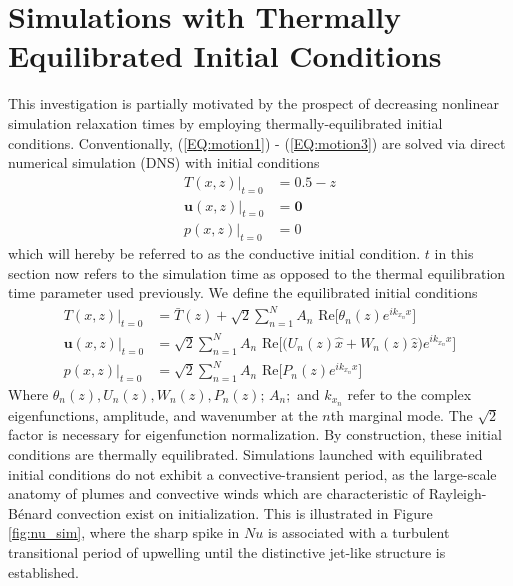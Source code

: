 \documentclass[reprint,amsmath,amssymb,aps]{revtex4-1}
\begin{document}
\section{Simulations with Thermally Equilibrated Initial Conditions}
This investigation is partially motivated by the prospect of decreasing nonlinear simulation relaxation times by employing thermally-equilibrated initial conditions. Conventionally, (\ref{EQ:motion1}) - (\ref{EQ:motion3}) are solved via direct numerical simulation (DNS) with initial conditions
\begin{align}
    T(x, z)\big|_{t=0} &= 0.5 - z \\
    \mathbf{u}(x, z)\big|_{t=0} &= \mathbf{0} \\
    p(x, z)\big|_{t=0} &= 0
\end{align}
which will hereby be referred to as the conductive initial condition. $t$ in this section now refers to the simulation time as opposed to the thermal equilibration time parameter used previously. We define the equilibrated initial conditions
\begin{align}
    T(x, z)\big|_{t=0} &= \bar{T}(z) + \sqrt{2} \sum_{n=1}^N  A_n \text{ Re} \Big[ \theta_n(z) e^{ik_{x_n}x} \Big] \nonumber \\
    \mathbf{u}(x, z)\big|_{t=0} &= \sqrt{2} \sum_{n=1}^N A_n \text{ Re} \Big[\Big( U_n (z) \hat{x} + W_n(z) \hat{z} \Big) e^{ik_{x_n}x} \Big] \nonumber\\
    p(x, z)\big|_{t=0} &= \sqrt{2} \sum_{n=1}^N A_n \text{ Re} \Big[P_n (z) e^{ik_{x_n}x}\Big]
\end{align}
Where $\theta_n(z), U_n(z), W_n(z), P_n(z); \, A_n; $ and $k_{x_n}$ refer to the complex eigenfunctions, amplitude, and wavenumber at the $n$th marginal mode. The $\sqrt{2}$ factor is necessary for eigenfunction normalization. By construction, these initial conditions are thermally equilibrated. 
Simulations launched with equilibrated initial conditions do not exhibit a convective-transient period, as the large-scale anatomy of plumes and convective winds which are characteristic of Rayleigh-B\'enard convection exist on initialization. This is illustrated in Figure \ref{fig:nu_sim}, where the sharp spike in $Nu$ is associated with a turbulent transitional period of upwelling until the distinctive jet-like structure is established. 
\end{document}
